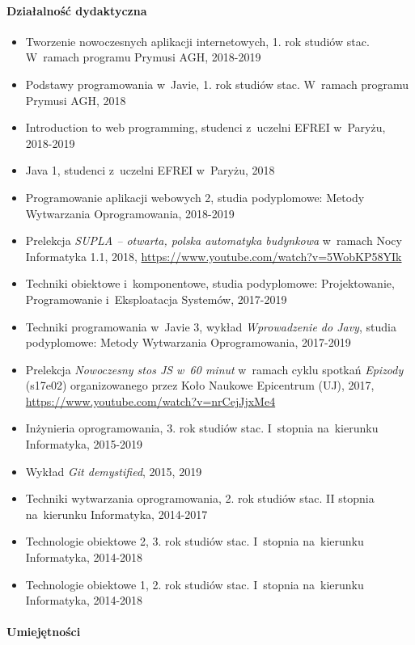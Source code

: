 \documentclass[twoside]{praca}
\begin{document}
\paragraph{Działalność dydaktyczna}
\begin{itemize}
\item Tworzenie nowoczesnych aplikacji internetowych, 1. rok studiów stac. W~ramach programu Prymusi AGH, 2018-2019
\item Podstawy programowania w~Javie, 1. rok studiów stac. W~ramach programu Prymusi AGH, 2018
\item Introduction to web programming, studenci z~uczelni EFREI w~Paryżu, 2018-2019
\item Java 1, studenci z~uczelni EFREI w~Paryżu, 2018
\item Programowanie aplikacji webowych 2, studia podyplomowe: Metody Wytwarzania Oprogramowania, 2018-2019
\item Prelekcja \textit{SUPLA -- otwarta, polska automatyka budynkowa} w~ramach Nocy Informatyka 1.1, 2018, \url{https://www.youtube.com/watch?v=5WobKP58YIk}
\item Techniki obiektowe i~komponentowe, studia podyplomowe: Projektowanie, Programowanie i~Eksploatacja Systemów, 2017-2019
\item Techniki programowania w~Javie 3, wykład \textit{Wprowadzenie do Javy}, studia podyplomowe: Metody Wytwarzania Oprogramowania, 2017-2019
\item Prelekcja \textit{Nowoczesny stos JS w~60 minut} w~ramach cyklu spotkań \textit{Epizody} (s17e02) organizowanego przez Koło Naukowe Epicentrum (UJ), 2017, \\\url{https://www.youtube.com/watch?v=nrCejJjxMe4}
\item Inżynieria oprogramowania, 3. rok studiów stac. I~stopnia na~kierunku Informatyka, 2015-2019
\item Wykład \textit{Git demystified}, 2015, 2019
\item Techniki wytwarzania oprogramowania, 2. rok studiów stac. II stopnia na~kierunku Informatyka, 2014-2017
\item Technologie obiektowe 2, 3. rok studiów stac. I~stopnia na~kierunku Informatyka, 2014-2018
\item Technologie obiektowe 1, 2. rok studiów stac. I~stopnia na~kierunku Informatyka, 2014-2018
\end{itemize}

\paragraph{Umiejętności}
\end{document}

